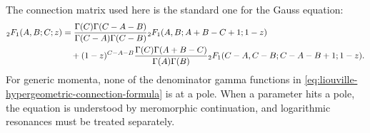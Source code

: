 \begin{proposition}
\[\]
The connection matrix used here is the standard one for the Gauss equation:
\begin{align}
  {}_2F_1(A,B;C;z)
  &=
  \frac{\Gamma(C)\Gamma(C-A-B)}
       {\Gamma(C-A)\Gamma(C-B)}
  {}_2F_1(A,B;A+B-C+1;1-z)
  \notag\\
  &\quad+
  (1-z)^{C-A-B}
  \frac{\Gamma(C)\Gamma(A+B-C)}
       {\Gamma(A)\Gamma(B)}
  {}_2F_1(C-A,C-B;C-A-B+1;1-z).
  \label{eq:liouville-hypergeometric-connection-formula}
\end{align}
For generic momenta, none of the denominator gamma functions in
\eqref{eq:liouville-hypergeometric-connection-formula} is at a pole.  When a
parameter hits a pole, the equation is understood by meromorphic
continuation, and logarithmic resonances must be treated separately.
\end{proposition}

